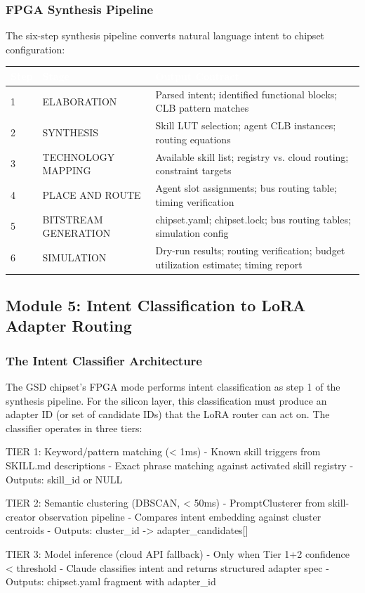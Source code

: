 \documentclass[11pt,letterpaper]{article}
\newcommand{\tableheader}[1]{\textbf{\sffamily\textcolor{white}{#1}}}
\begin{document}
\subsubsection{FPGA Synthesis Pipeline}

The six-step synthesis pipeline converts natural language intent to chipset configuration:

\begin{center}
\begin{tabularx}{\textwidth}{C{0.8cm}L{3cm}X}
\toprule
{}
\tableheader{Step} & \tableheader{Stage} & \tableheader{Output Contract} \\
 & ELABORATION & Parsed intent; identified functional blocks; CLB pattern matches \\
2 & SYNTHESIS & Skill LUT selection; agent CLB instances; routing equations \\
3 & TECHNOLOGY MAPPING & Available skill list; registry vs. cloud routing; constraint targets \\
4 & PLACE AND ROUTE & Agent slot assignments; bus routing table; timing verification \\
5 & BITSTREAM GENERATION & chipset.yaml; chipset.lock; bus routing tables; simulation config \\
6 & SIMULATION & Dry-run results; routing verification; budget utilization estimate; timing report \\
\bottomrule
\end{tabularx}
\end{center}

\subsection{Module 5: Intent Classification to LoRA Adapter Routing}

\subsubsection{The Intent Classifier Architecture}

The GSD chipset's FPGA mode performs intent classification as step 1 of the synthesis pipeline. For the silicon layer, this classification must produce an adapter ID (or set of candidate IDs) that the LoRA router can act on. The classifier operates in three tiers:

\begin{asciibox}
TIER 1: Keyword/pattern matching (< 1ms)
  - Known skill triggers from SKILL.md descriptions
  - Exact phrase matching against activated skill registry
  - Outputs: skill_id or NULL

TIER 2: Semantic clustering (DBSCAN, < 50ms)
  - PromptClusterer from skill-creator observation pipeline
  - Compares intent embedding against cluster centroids
  - Outputs: cluster_id -> adapter_candidates[]

TIER 3: Model inference (cloud API fallback)
  - Only when Tier 1+2 confidence < threshold
  - Claude classifies intent and returns structured adapter spec
  - Outputs: chipset.yaml fragment with adapter_id
\end{asciibox}
\end{document}
